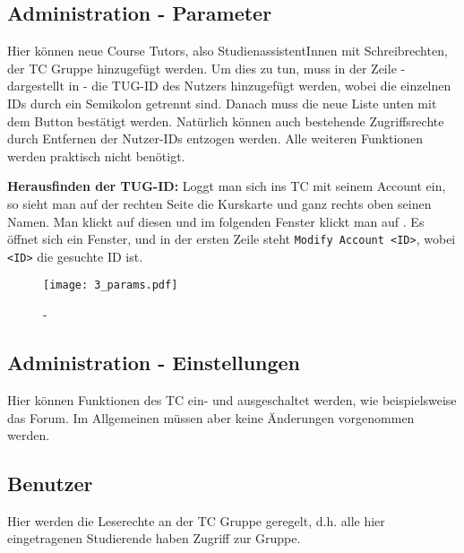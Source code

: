 
\subsection{Administration - Parameter}

Hier können neue \glqq{}Course Tutors\grqq{}, also StudienassistentInnen mit
Schreibrechten, der TC Gruppe hinzugefügt werden. Um dies zu tun, muss in
der Zeile  - dargestellt in  - 
die TUG-ID des Nutzers hinzugefügt werden, wobei die einzelnen IDs durch ein 
Semikolon getrennt sind. Danach muss die neue Liste unten mit dem Button 
 bestätigt werden. Natürlich können auch bestehende Zugriffsrechte 
durch Entfernen der Nutzer-IDs entzogen werden. Alle weiteren Funktionen werden 
praktisch nicht benötigt.

{\bf Herausfinden der TUG-ID:} Loggt man sich ins TC mit seinem Account ein, so
sieht man auf der rechten Seite die Kurskarte und ganz rechts oben seinen Namen.
Man klickt auf diesen und im folgenden Fenster klickt man auf
. Es öffnet sich ein Fenster, und in der ersten Zeile
steht {\tt Modify Account \grqq{}<ID>\grqq{}}, wobei {\tt <ID>} die gesuchte
ID ist.

\begin{figure}[htbp]
\begin{center}
  \texttt{[image: 3\_params.pdf]}
  \caption{  -  }
  \label{fig:params}
\end{center}
\end{figure}

\subsection{Administration - Einstellungen}

Hier können Funktionen des TC ein- und ausgeschaltet werden, wie beispielsweise
das Forum. Im Allgemeinen müssen aber keine Änderungen vorgenommen werden.

\subsection{Benutzer}

Hier werden die Leserechte an der TC Gruppe geregelt, d.h. alle hier 
eingetragenen Studierende haben Zugriff zur Gruppe. 

